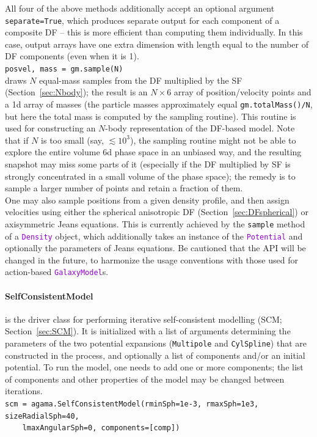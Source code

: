 \documentclass[12pt]{article}
\newcommand{\ttt}[1]{\textcolor{darkviolet}{\texttt{#1}}}
\newcommand{\ppp}[1]{\textcolor{darkolive} {\texttt{#1}}}
\let\oldparagraph\paragraph
\renewcommand{\paragraph}[1]{\vspace{-2mm}\oldparagraph{#1}}
\begin{document}
All four of the above methods additionally accept an optional argument \texttt{separate=True}, which produces separate output for each component of a composite DF -- this is more efficient than computing them individually. In this case, output arrays have one extra dimension with length equal to the number of DF components (even when it is 1).
\\[2mm]
\texttt{posvel, mass = gm.sample(N)}\\
draws $N$ equal-mass samples from the DF multiplied by the SF (Section~\ref{sec:Nbody}); the result is an $N\times6$ array of position/velocity points and a 1d array of masses (the particle masses approximately equal \texttt{gm.totalMass()/N}, but here the total mass is computed by the sampling routine). This routine is used for constructing an $N$-body representation of the DF-based model. Note that if $N$ is too small (say, $\lesssim 10^3$), the sampling routine might not be able to explore the entire volume 6d phase space in an unbiased way, and the resulting snapshot may miss some parts of it (especially if the DF multiplied by SF is strongly concentrated in a small volume of the phase space); the remedy is to sample a larger number of points and retain a fraction of them.
\\[2mm]
One may also sample positions from a given density profile, and then assign velocities using either the spherical anisotropic DF (Section~\ref{sec:DFspherical}) or axisymmetric Jeans equations. This is currently achieved by the \texttt{sample} method of a \ttt{Density} object, which additionally takes an instance of the \ttt{Potential} and optionally the parameters of Jeans equations. Be cautioned that the API will be changed in the future, to harmonize the usage conventions with those used for action-based \ttt{GalaxyModel}s.

\paragraph{SelfConsistentModel} is the driver class for performing iterative self-consistent modelling (SCM; Section~\ref{sec:SCM}). It is initialized with a list of arguments determining the parameters of the two potential expansions (\ppp{Multipole} and \ppp{CylSpline}) that are constructed in the process, and optionally a list of components and/or an initial potential. To run the model, one needs to add one or more components; the list of components and other properties of the model may be changed between iterations.\\
\texttt{scm = agama.SelfConsistentModel(rminSph=1e-3, rmaxSph=1e3, sizeRadialSph=40,\\ \mbox{}~~~~lmaxAngularSph=0, components=[comp])}
\end{document}
